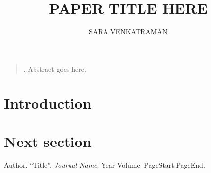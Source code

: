 \documentclass[10pt]{article}
\renewenvironment{abstract}
{\small\begin{quote}\noindent \par{\sc \abstractname.}}
  {\noindent\end{quote}}
\theoremstyle{definition}
\begin{document}
\title{\normalsize\bfseries\MakeUppercase{Paper Title here}}
\author{\footnotesize\MakeUppercase{Sara Venkatraman}} \date{\vspace{-5ex}}\maketitle

\begin{abstract}
  Abstract goes here.
\end{abstract}

\section{Introduction}

\section{Next section}

{\small\begin{thebibliography}{1}    
    Author.
    ``Title''.
    \textit{Journal Name}.
    Year Volume: PageStart-PageEnd.
  \end{thebibliography}}
\end{document}
